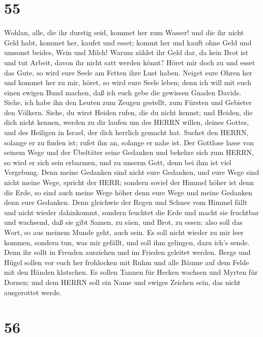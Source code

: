 \hypertarget{section-54}{%
\section{55}\label{section-54}}

 Wohlan, alle, die ihr durstig seid, kommet her zum Wasser!
und die ihr nicht Geld habt, kommet her, kaufet und esset; kommt her und
kauft ohne Geld und umsonst beides, Wein und Milch!  Warum
zählet ihr Geld dar, da kein Brot ist und tut Arbeit, davon ihr nicht
satt werden könnt? Höret mir doch zu und esset das Gute, so wird eure
Seele am Fetten ihre Lust haben.  Neiget eure Ohren her und
kommet her zu mir, höret, so wird eure Seele leben; denn ich will mit
euch einen ewigen Bund machen, daß ich euch gebe die gewissen Gnaden
Davids.  Siehe, ich habe ihn den Leuten zum Zeugen gestellt,
zum Fürsten und Gebieter den Völkern.  Siehe, du wirst
Heiden rufen, die du nicht kennst; und Heiden, die dich nicht kennen,
werden zu dir laufen um des HERRN willen, deines Gottes, und des
Heiligen in Israel, der dich herrlich gemacht hat.  Suchet
den HERRN, solange er zu finden ist; rufet ihn an, solange er nahe ist.
 Der Gottlose lasse von seinem Wege und der Übeltäter seine
Gedanken und bekehre sich zum HERRN, so wird er sich sein erbarmen, und
zu unserm Gott, denn bei ihm ist viel Vergebung.  Denn meine
Gedanken sind nicht eure Gedanken, und eure Wege sind nicht meine Wege,
spricht der HERR;  sondern soviel der Himmel höher ist denn
die Erde, so sind auch meine Wege höher denn eure Wege und meine
Gedanken denn eure Gedanken.  Denn gleichwie der Regen und
Schnee vom Himmel fällt und nicht wieder dahinkommt, sondern feuchtet
die Erde und macht sie fruchtbar und wachsend, daß sie gibt Samen, zu
säen, und Brot, zu essen:  also soll das Wort, so aus
meinem Munde geht, auch sein. Es soll nicht wieder zu mir leer kommen,
sondern tun, was mir gefällt, und soll ihm gelingen, dazu ich's sende.
 Denn ihr sollt in Freuden ausziehen und im Frieden
geleitet werden. Berge und Hügel sollen vor euch her frohlocken mit Ruhm
und alle Bäume auf dem Felde mit den Händen klatschen.  Es
sollen Tannen für Hecken wachsen und Myrten für Dornen; und dem HERRN
soll ein Name und ewiges Zeichen sein, das nicht ausgerottet werde.

\hypertarget{section-55}{%
\section{56}\label{section-55}}


